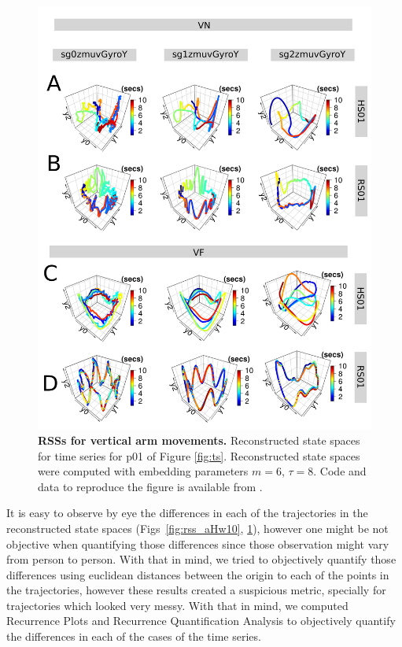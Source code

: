 \documentclass[fleqn,10pt]{wlscirep}
\begin{document}
\begin{figure}[ht]
\centering
\includegraphics[width=1.0\textwidth]{figures/rss/pdf/fig4}
    \caption{
	{\bf RSSs for vertical arm movements.}
	Reconstructed state spaces for time series for p01 of Figure \ref{fig:ts}.
	Reconstructed state spaces were computed with 
	embedding parameters $m=6$, $\tau=8$.
	Code and data to reproduce the figure is available from \cite{srep2019}.
        }
    \label{fig:rss_aVw10}
\end{figure}

It is easy to observe by eye the differences in each of the
trajectories in the reconstructed state spaces 
(Figs~\ref{fig:rss_aHw10}, \ref{fig:rss_aVw10}), 
however one might be not objective when quantifying those differences 
since those observation might vary from person to person.
With that in mind, we tried to objectively quantify those differences 
using euclidean distances between the origin to each of the points in the 
trajectories, however these results created a suspicious metric, specially 
for trajectories which looked very messy.
With that in mind, we computed Recurrence Plots and 
Recurrence Quantification Analysis to objectively quantify 
the differences in each of the cases of the time series.
\end{document}
